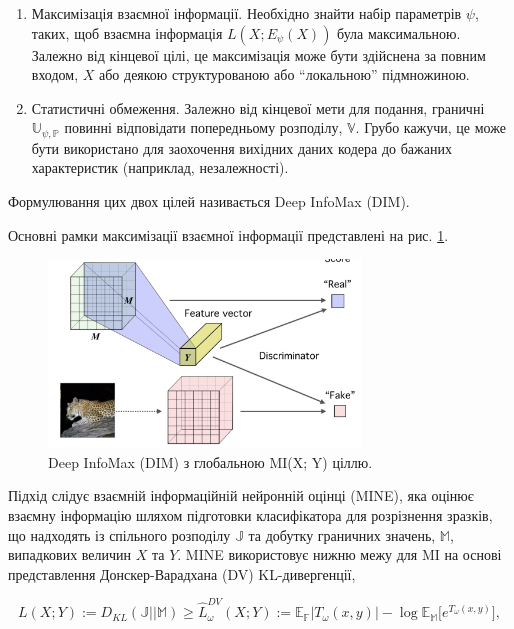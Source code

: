 \begin{enumerate}
	\item Максимізація взаємної інформації. Необхідно знайти набір параметрів $\psi$, таких, щоб взаємна інформація $L(X; E_{\psi} (X))$ була максимальною. Залежно від кінцевої цілі, це максимізація може бути здійснена за повним входом, $X$ або деякою структурованою або “локальною” підмножиною.
	\item Статистичні обмеження. Залежно від кінцевої мети для подання, граничні $\mathbb{U}_{\psi, \mathbb{P}}$ повинні відповідати попередньому розподілу, $\mathbb{V}$. Грубо кажучи, це може бути використано для заохочення вихідних даних кодера до бажаних характеристик (наприклад, незалежності).
\end{enumerate}

Формулювання цих двох цілей називається Deep InfoMax (DIM).

Основні рамки максимізації взаємної інформації представлені на рис. \ref{fig:deepinfo2}. 

\vspace{1em}

\begin{figure}[h]
  \includegraphics[width=\textwidth, height=5cm, natwidth=266, natheight=160]{Mal/deepinfo2.jpg}
  \caption{Deep InfoMax (DIM) з глобальною MI(X; Y) ціллю.}
  \label{fig:deepinfo2}
\end{figure}

Підхід слідує взаємній інформаційній нейронній оцінці (MINE), яка оцінює взаємну інформацію шляхом підготовки класифікатора для розрізнення зразків, що надходять із спільного розподілу $\mathbb{J}$ та добутку граничних значень, $\mathbb{M}$, випадкових величин $X$ та $Y$. MINE використовує нижню межу для MI на основі представлення Донскер-Варадхана (DV) KL-дивергенції,

\begin{equation}\label{eq:dv}
L(X; Y) := D_{KL}(\mathbb{J}||\mathbb{M}) \ge \hat{L}_{\omega}^{DV}(X;Y):=\mathbb{E}_{\mathbb{F}}|T_{\omega}(x,y)| - \log{\mathbb{E}_{\mathbb{M}}[e^{T_{\omega}(x,y)}}],
\end{equation}

